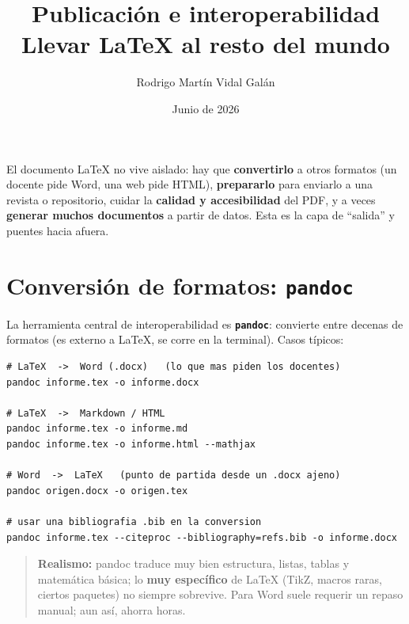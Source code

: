 \documentclass[11pt,a4paper]{article}
\title{\textbf{Publicación e interoperabilidad}\\[2pt]
       \large Llevar \LaTeX{} al resto del mundo}
\author{Rodrigo Martín Vidal Galán}
\date{Junio de 2026}
\begin{document}
\maketitle

\noindent El documento \LaTeX{} no vive aislado: hay que \textbf{convertirlo} a
otros formatos (un docente pide Word, una web pide HTML), \textbf{prepararlo}
para enviarlo a una revista o repositorio, cuidar la \textbf{calidad y
accesibilidad} del PDF, y a veces \textbf{generar muchos documentos} a partir de
datos. Esta es la capa de \enquote{salida} y puentes hacia afuera.

\newpage
\tableofcontents
\newpage

\section{Conversión de formatos: \texttt{pandoc}}
La herramienta central de interoperabilidad es \textbf{\texttt{pandoc}}: convierte
entre decenas de formatos (es externo a \LaTeX, se corre en la terminal). Casos
típicos:
\begin{lstlisting}
# LaTeX  ->  Word (.docx)   (lo que mas piden los docentes)
pandoc informe.tex -o informe.docx

# LaTeX  ->  Markdown / HTML
pandoc informe.tex -o informe.md
pandoc informe.tex -o informe.html --mathjax

# Word  ->  LaTeX   (punto de partida desde un .docx ajeno)
pandoc origen.docx -o origen.tex

# usar una bibliografia .bib en la conversion
pandoc informe.tex --citeproc --bibliography=refs.bib -o informe.docx
\end{lstlisting}
\begin{quote}\small
\textbf{Realismo:} pandoc traduce muy bien estructura, listas, tablas y
matemática básica; lo \textbf{muy específico} de \LaTeX{} (TikZ, macros raras,
ciertos paquetes) no siempre sobrevive. Para Word suele requerir un repaso
manual; aun así, ahorra horas.
\end{quote}

\end{document}

